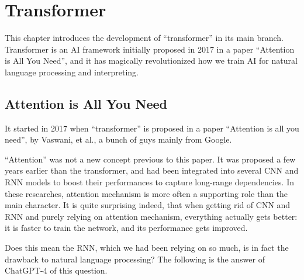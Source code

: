 \chapter{Transformer} \label{ch:transformer}

This chapter introduces the development of ``transformer'' in its main branch. Transformer is an AI framework initially proposed in 2017 in a paper ``Attention is All You Need'', and it has magically revolutionized how we train AI for natural language processing and interpreting.

\section{Attention is All You Need}

It started in 2017 when ``transformer'' is proposed in a paper ``Attention is all you need'', by Vaswani, et al., a bunch of guys mainly from Google.

``Attention'' was not a new concept previous to this paper. It was proposed a few years earlier than the transformer, and had been integrated into several CNN and RNN models to boost their performances to capture long-range dependencies. In these researches, attention mechanism is more often a supporting role than the main character. It is quite surprising indeed, that when getting rid of CNN and RNN and purely relying on attention mechanism, everything actually gets better: it is faster to train the network, and its performance gets improved.

Does this mean the RNN, which we had been relying on so much, is in fact the drawback to natural language processing? The following is the answer of ChatGPT-4 of this question.


